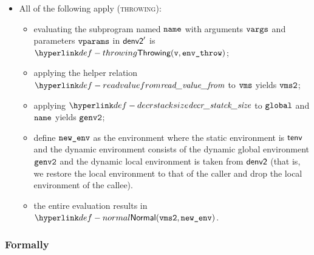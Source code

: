 \begin{itemize}
\begin{itemize}
    \item All of the following apply (\textsc{throwing}):
    \begin{itemize}
      \item evaluating the subprogram named $\name$ with arguments $\vvargs$ and parameters $\vvparams$ in
            $\denvtwo'$ is $\Throwing(\vv, \envthrow)$\ProseOrError;
      \item applying the helper relation $\readvaluefrom$ to $\vms$ yields $\vmstwo$;
      \item applying $\decrstacksize$ to $\vglobal$ and $\name$ yields $\genvtwo$;
      \item define $\newenv$ as the environment where the static environment is $\tenv$ and the dynamic environment consists
            of the dynamic global environment $\genvtwo$ and the dynamic local environment is taken from $\denvtwo$
            (that is, we restore the local environment to that of the caller and drop the local environment of the callee).
      \item the entire evaluation results in $\Normal(\vmstwo, \newenv)$.
    \end{itemize}
  \end{itemize}
\end{itemize}

\subsubsection{Formally}
\begin{mathpar}
\end{mathpar}

